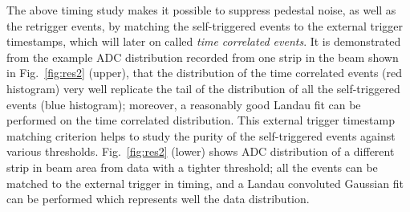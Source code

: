 \documentclass[journal]{IEEEtran}
\begin{document}
The above timing study makes it possible to suppress pedestal noise, as well as the retrigger events, by matching the self-triggered events to the external trigger timestamps, which will later on called \textit{time correlated events}.
It is demonstrated from the example ADC distribution recorded from one strip in the beam shown in Fig.~\ref{fig:res2} (upper),
that the distribution of the time correlated events (red histogram) very well replicate the tail of the distribution of all the self-triggered events (blue histogram);
moreover, a reasonably good Landau fit can be performed on the time correlated distribution.
This external trigger timestamp matching criterion helps to study the purity of the self-triggered events against various thresholds.
Fig.~\ref{fig:res2} (lower) shows ADC distribution of a different strip in beam area from data with a tighter threshold;
all the events can be matched to the external trigger in timing, and a Landau convoluted Gaussian fit can be performed which represents well the data distribution.

\end{document}
